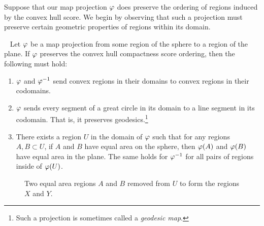 Suppose that our map projection $\varphi$ does  preserve the ordering of regions induced by the convex hull score.  We begin by observing that such a projection must preserve certain geometric properties of regions within its domain.
\begin{lemma}~\label{lem:CH_prep}
	Let $\varphi$ be a map projection from some region of the sphere to a region of the plane. If $\varphi$ preserves the convex hull compactness score ordering, then the following must 
	hold:
	\begin{enumerate}
		\item $\varphi$ and $\varphi^{-1}$ send convex regions in their domains to convex regions in their codomains.
		\item $\varphi$ sends every segment of a great circle in its domain to a line segment in its codomain.  That is, it preserves geodesics.\footnote{Such a projection is sometimes called a \textit{geodesic map}.}
		\item There exists a region $U$ in the domain of $\varphi$
		such that for any regions $A,B\subset U$, if 
		$A$ and $B$ have equal area on the sphere, then 
		$\varphi(A)$ and $\varphi(B)$ have equal area in the plane.  The same holds 
		for $\varphi^{-1}$ for all pairs of regions inside of $\varphi(U)$.
	\end{enumerate}
\end{lemma}


\ifsmallfigs
\else
\begin{figure}[h]
	\centering
	\begin{minipage}{.3\textwidth}
	
			\end{minipage}
	\begin{minipage}{.3\textwidth}
	
\end{minipage}
	\begin{minipage}{.3\textwidth}
	
\end{minipage}
	\caption{Two equal area regions $A$ and $B$ removed from $U$ to form the regions $X$ and $Y$.}
	\label{fig:ch_schema}
\end{figure}
\fi



